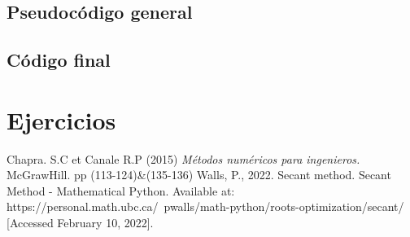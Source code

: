 \documentclass[12pt,oneside,FLEQN]{report}
\begin{document}
{	\section{Pseudocódigo general}
		
	\section{Código final}
		
\chapter{Ejercicios}
\begin{thebibliography}{7}
	\bibitem [1] Chapra. S.C et Canale R.P (2015) {\it Métodos numéricos para ingenieros.} McGrawHill. pp (113-124)\&(135-136)
	\bibitem [2] Walls, P., 2022. Secant method. Secant Method - Mathematical Python. Available at: https://personal.math.ubc.ca/~pwalls/math-python/roots-optimization/secant/ [Accessed February 10, 2022]. 
\end{thebibliography}
}
\end{document}
